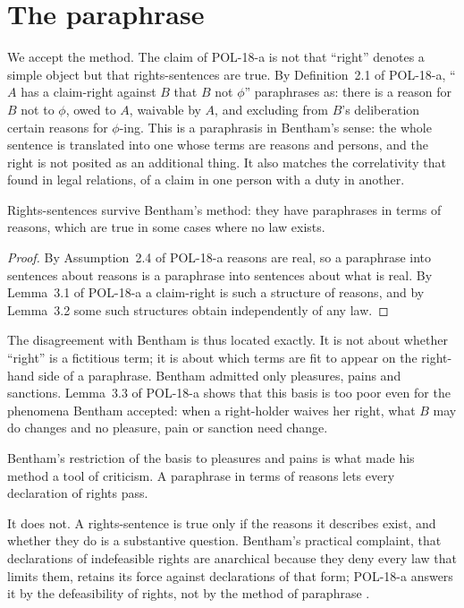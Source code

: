 \documentclass{situationist-preprint}
\begin{document}
\section{The paraphrase}

We accept the method. The claim of POL-18-a is not that \enquote{right} denotes a simple object but that rights-sentences are true. By Definition~2.1 of POL-18-a, \enquote{$A$ has a claim-right against $B$ that $B$ not $\phi$} paraphrases as: there is a reason for $B$ not to $\phi$, owed to $A$, waivable by $A$, and excluding from $B$'s deliberation certain reasons for $\phi$-ing. This is a paraphrasis in Bentham's sense: the whole sentence is translated into one whose terms are reasons and persons, and the right is not posited as an additional thing. It also matches the correlativity that \citet{Hohfeld1913} found in legal relations, of a claim in one person with a duty in another.

\begin{proposition}\label{p:survive}
Rights-sentences survive Bentham's method: they have paraphrases in terms of reasons, which are true in some cases where no law exists.
\end{proposition}

\begin{proof}
By Assumption~2.4 of POL-18-a reasons are real, so a paraphrase into sentences about reasons is a paraphrase into sentences about what is real. By Lemma~3.1 of POL-18-a a claim-right is such a structure of reasons, and by Lemma~3.2 some such structures obtain independently of any law.
\end{proof}

The disagreement with Bentham is thus located exactly. It is not about whether \enquote{right} is a fictitious term; it is about which terms are fit to appear on the right-hand side of a paraphrase. Bentham admitted only pleasures, pains and sanctions. Lemma~3.3 of POL-18-a shows that this basis is too poor even for the phenomena Bentham accepted: when a right-holder waives her right, what $B$ may do changes and no pleasure, pain or sanction need change.

\begin{objection}
Bentham's restriction of the basis to pleasures and pains is what made his method a tool of criticism. A paraphrase in terms of reasons lets every declaration of rights pass.
\end{objection}

\begin{reply}
It does not. A rights-sentence is true only if the reasons it describes exist, and whether they do is a substantive question. Bentham's practical complaint, that declarations of indefeasible rights are anarchical because they deny every law that limits them, retains its force against declarations of that form; POL-18-a answers it by the defeasibility of rights, not by the method of paraphrase \citep{Waldron1987}.
\end{reply}
\end{document}
